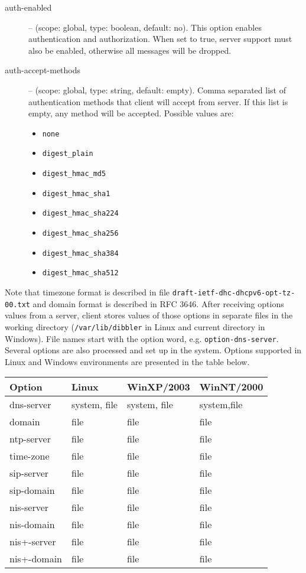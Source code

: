 \begin{description}
 \item[auth-enabled] -- (scope: global, type: boolean, default: no). This
            option enables authentication and authorization. When set
            to true, server support must also be enabled, otherwise
            all messages will be dropped.
 \item[auth-accept-methods] -- (scope: global, type: string, default: empty).
            Comma separated list of authentication methods that client will
            accept from server. If this list is empty, any method will be
            accepted. Possible values are:
            \begin{itemize}
             \item \texttt{none}
             \item \texttt{digest\_plain}
             \item \texttt{digest\_hmac\_md5}
             \item \texttt{digest\_hmac\_sha1}
             \item \texttt{digest\_hmac\_sha224}
             \item \texttt{digest\_hmac\_sha256}
             \item \texttt{digest\_hmac\_sha384}
             \item \texttt{digest\_hmac\_sha512}
            \end{itemize}
\end{description}

Note that timezone format is described in file \verb+draft-ietf-dhc-dhcpv6-opt-tz-00.txt+
and domain format is described in RFC 3646. After receiving options
values from a server, client stores values of those options in separate
files in the working directory (\verb+/var/lib/dibbler+ in Linux and
current directory in Windows). File names start with the option word,
e.g. \verb+option-dns-server+. Several options are also processed and
set up in the system. Options supported in Linux and Windows
environments are presented in the table below.


\begin{center}
\begin{tabular}{|l|l|l|l|}
\hline
Option & Linux & WinXP/2003 & WinNT/2000  \\
\hline
dns-server  & system, file & system, file & system,file \\
domain      & file         & file & file \\
ntp-server  & file         & file & file \\
time-zone   & file         & file & file \\
sip-server  & file         & file & file \\
sip-domain  & file         & file & file \\
nis-server  & file         & file & file \\
nis-domain  & file         & file & file \\
nis+-server & file         & file & file \\
nis+-domain & file         & file & file \\
\hline
\end{tabular}
\end{center}

